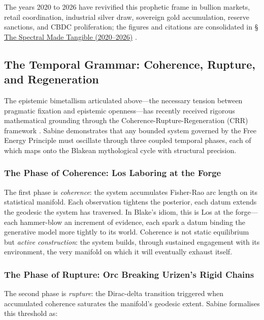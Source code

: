 \documentclass[
]{article}
\begin{document}
The years 2020 to 2026 have revivified this prophetic frame in bullion
markets, retail coordination, industrial silver draw, sovereign gold
accumulation, reserve sanctions, and CBDC proliferation; the figures and
citations are consolidated in \hyperref[sec-spectral-2020-2026]{§ The
Spectral Made Tangible (2020--2026)}
\citep{worldgoldcouncil2024demand, eichengreen2022sanctions, atlanticcouncil2026cbdc, blake1794urizen}.

\subsection{The Temporal Grammar: Coherence, Rupture, and
Regeneration}\label{the-temporal-grammar-coherence-rupture-and-regeneration}

The epistemic bimetallism articulated above---the necessary tension
between pragmatic fixation and epistemic openness---has recently
received rigorous mathematical grounding through the
Coherence-Rupture-Regeneration (CRR) framework \citep{sabine2026doors}.
Sabine demonstrates that any bounded system governed by the Free Energy
Principle must oscillate through three coupled temporal phases, each of
which maps onto the Blakean mythological cycle with structural
precision.

\subsubsection{The Phase of Coherence: Los Laboring at the
Forge}\label{the-phase-of-coherence-los-laboring-at-the-forge}

The first phase is \emph{coherence}: the system accumulates Fisher-Rao
arc length on its statistical manifold. Each observation tightens the
posterior, each datum extends the geodesic the system has traversed. In
Blake's idiom, this is Los at the forge---each hammer-blow an increment
of evidence, each spark a datum binding the generative model more
tightly to its world. Coherence is not static equilibrium but
\emph{active construction}: the system builds, through sustained
engagement with its environment, the very manifold on which it will
eventually exhaust itself.

\subsubsection{The Phase of Rupture: Orc Breaking Urizen's Rigid
Chains}\label{the-phase-of-rupture-orc-breaking-urizens-rigid-chains}

The second phase is \emph{rupture}: the Dirac-delta transition triggered
when accumulated coherence saturates the manifold's geodesic extent.
Sabine formalises this threshold as:
\end{document}
